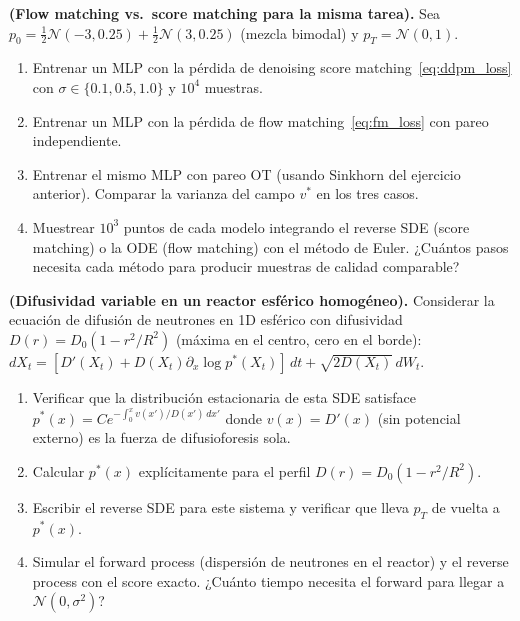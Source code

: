 \begin{ejercicio}
\textbf{(Flow matching vs.\ score matching para la misma tarea).}
Sea $p_0 = \frac{1}{2}\mathcal{N}(-3,0.25) + \frac{1}{2}\mathcal{N}(3,0.25)$
(mezcla bimodal) y $p_T = \mathcal{N}(0,1)$.
\begin{enumerate}[label=(\alph*)]
  \item Entrenar un MLP con la pérdida de denoising score matching~\eqref{eq:ddpm_loss}
        con $\sigma \in \{0.1, 0.5, 1.0\}$ y $10^4$ muestras.
  \item Entrenar un MLP con la pérdida de flow matching~\eqref{eq:fm_loss}
        con pareo independiente.
  \item Entrenar el mismo MLP con pareo OT (usando Sinkhorn del ejercicio
        anterior). Comparar la varianza del campo $v^*$ en los tres casos.
  \item Muestrear $10^3$ puntos de cada modelo integrando el reverse SDE
        (score matching) o la ODE (flow matching) con el método de Euler.
        ¿Cuántos pasos necesita cada método para producir muestras de calidad
        comparable?
\end{enumerate}
\end{ejercicio}

\begin{ejercicio}
\textbf{(Difusividad variable en un reactor esférico homogéneo).}
Considerar la ecuación de difusión de neutrones en 1D esférico con difusividad
$D(r) = D_0(1-r^2/R^2)$ (máxima en el centro, cero en el borde):
$dX_t = [D'(X_t) + D(X_t)\partial_x\log p^*(X_t)]\,dt + \sqrt{2D(X_t)}\,dW_t$.
\begin{enumerate}[label=(\alph*)]
  \item Verificar que la distribución estacionaria de esta SDE satisface
        $p^*(x) = Ce^{-\int_0^x v(x')/D(x')\,dx'}$ donde $v(x) = D'(x)$
        (sin potencial externo) es la fuerza de difusioforesis sola.
  \item Calcular $p^*(x)$ explícitamente para el perfil $D(r) = D_0(1-r^2/R^2)$.
  \item Escribir el reverse SDE para este sistema y verificar que lleva $p_T$
        de vuelta a $p^*(x)$.
  \item Simular el forward process (dispersión de neutrones en el reactor) y
        el reverse process con el score exacto. ¿Cuánto tiempo necesita el
        forward para llegar a $\mathcal{N}(0,\sigma^2)$?
\end{enumerate}
\end{ejercicio}

\printbibliography[heading=subbibliography]